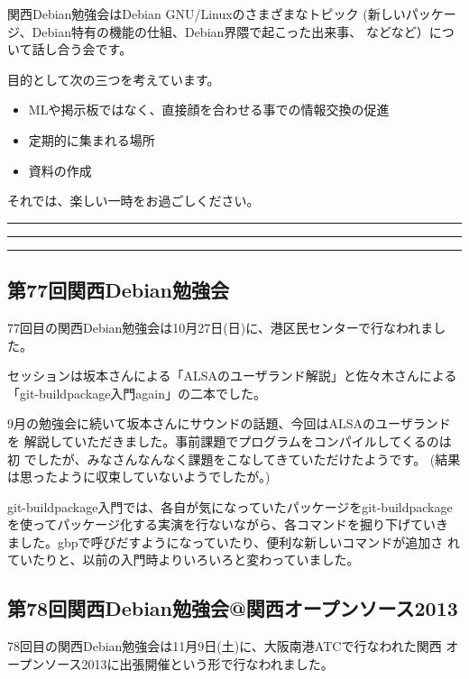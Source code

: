 \documentclass[mingoth,a4paper]{jsarticle}
\begin{document}
 関西Debian勉強会はDebian GNU/Linuxのさまざまなトピック
 (新しいパッケージ、Debian特有の機能の仕組、Debian界隈で起こった出来事、
 などなど）について話し合う会です。

 目的として次の三つを考えています。
 \begin{itemize}
  \item MLや掲示板ではなく、直接顔を合わせる事での情報交換の促進
  \item 定期的に集まれる場所
  \item 資料の作成
 \end{itemize}

 それでは、楽しい一時をお過ごしください。

\newpage

\begin{minipage}[b]{0.2\hsize}
 {}
\end{minipage}
\begin{minipage}[b]{0.8\hsize}
\hrule
\vspace{2mm}
\hrule
\setcounter{tocdepth}{1}
\tableofcontents
\vspace{2mm}
\hrule
\end{minipage}


\subsection{第77回関西Debian勉強会}

77回目の関西Debian勉強会は10月27日(日)に、港区民センターで行なわれまし
た。

セッションは坂本さんによる「ALSAのユーザランド解説」と佐々木さんによる
「git-buildpackage入門again」の二本でした。

9月の勉強会に続いて坂本さんにサウンドの話題、今回はALSAのユーザランドを
解説していただきました。事前課題でプログラムをコンパイルしてくるのは初
でしたが、みなさんなんなく課題をこなしてきていただけたようです。
(結果は思ったように収束していないようでしたが。)

git-buildpackage入門では、各自が気になっていたパッケージをgit-buildpackage
を使ってパッケージ化する実演を行ないながら、各コマンドを掘り下げていき
ました。gbpで呼びだすようになっていたり、便利な新しいコマンドが追加さ
れていたりと、以前の入門時よりいろいろと変わっていました。

\subsection{第78回関西Debian勉強会@関西オープンソース2013}
78回目の関西Debian勉強会は11月9日(土)に、大阪南港ATCで行なわれた関西
オープンソース2013に出張開催という形で行なわれました。
\end{document}

